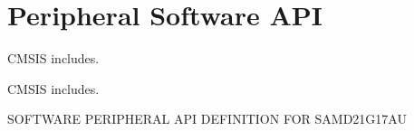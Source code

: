 \hypertarget{group___s_a_m_d21_g17_a_u__api}{}\section{Peripheral Software A\+PI}
\label{group___s_a_m_d21_g17_a_u__api}


C\+M\+S\+IS includes.  


C\+M\+S\+IS includes. 

S\+O\+F\+T\+W\+A\+RE P\+E\+R\+I\+P\+H\+E\+R\+AL A\+PI D\+E\+F\+I\+N\+I\+T\+I\+ON F\+OR S\+A\+M\+D21\+G17\+AU 